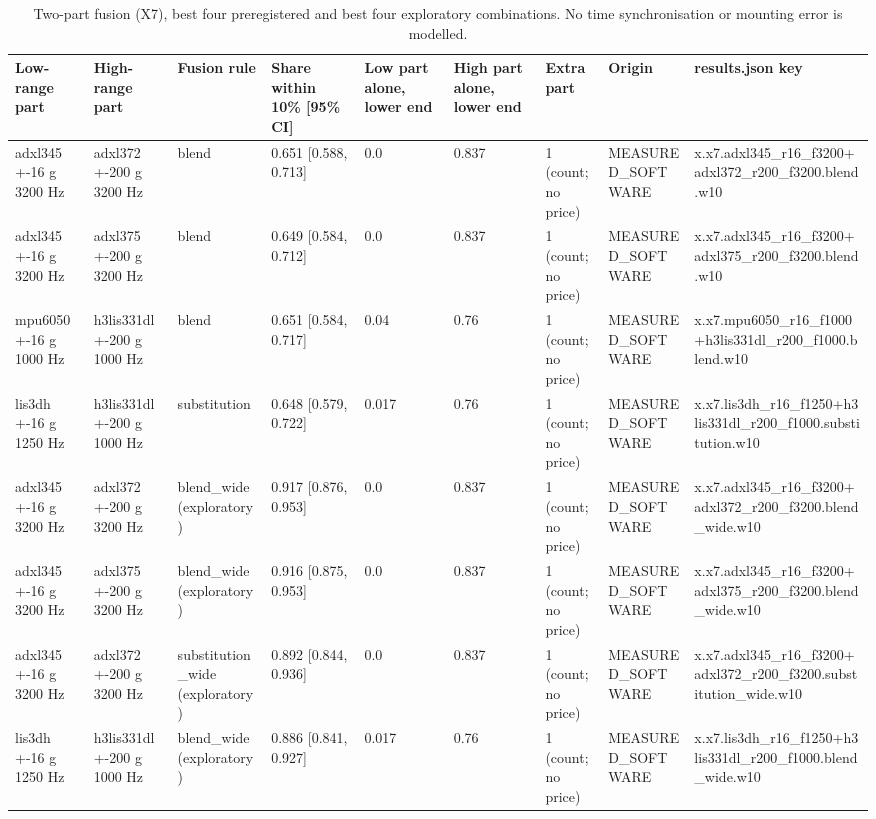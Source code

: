 \begin{table}[t]
\centering
\small
\caption{Two-part fusion (X7), best four preregistered and best four exploratory combinations. No time synchronisation or mounting error is modelled.}
\label{tab:jp_tab_x7}
\begin{tabular}{lllllllll}
\toprule
Low-range part & High-range part & Fusion rule & Share within 10\% [95\% CI] & Low part alone, lower end & High part alone, lower end & Extra part & Origin & results.json key \\
\midrule
adxl345 +-16 g 3200 Hz & adxl372 +-200 g 3200 Hz & blend & 0.651 [0.588, 0.713] & 0.0 & 0.837 & 1 (count; no price) & MEASURED\_SOFTWARE & x.x7.adxl345\_r16\_f3200+adxl372\_r200\_f3200.blend.w10 \\
adxl345 +-16 g 3200 Hz & adxl375 +-200 g 3200 Hz & blend & 0.649 [0.584, 0.712] & 0.0 & 0.837 & 1 (count; no price) & MEASURED\_SOFTWARE & x.x7.adxl345\_r16\_f3200+adxl375\_r200\_f3200.blend.w10 \\
mpu6050 +-16 g 1000 Hz & h3lis331dl +-200 g 1000 Hz & blend & 0.651 [0.584, 0.717] & 0.04 & 0.76 & 1 (count; no price) & MEASURED\_SOFTWARE & x.x7.mpu6050\_r16\_f1000+h3lis331dl\_r200\_f1000.blend.w10 \\
lis3dh +-16 g 1250 Hz & h3lis331dl +-200 g 1000 Hz & substitution & 0.648 [0.579, 0.722] & 0.017 & 0.76 & 1 (count; no price) & MEASURED\_SOFTWARE & x.x7.lis3dh\_r16\_f1250+h3lis331dl\_r200\_f1000.substitution.w10 \\
adxl345 +-16 g 3200 Hz & adxl372 +-200 g 3200 Hz & blend\_wide (exploratory) & 0.917 [0.876, 0.953] & 0.0 & 0.837 & 1 (count; no price) & MEASURED\_SOFTWARE & x.x7.adxl345\_r16\_f3200+adxl372\_r200\_f3200.blend\_wide.w10 \\
adxl345 +-16 g 3200 Hz & adxl375 +-200 g 3200 Hz & blend\_wide (exploratory) & 0.916 [0.875, 0.953] & 0.0 & 0.837 & 1 (count; no price) & MEASURED\_SOFTWARE & x.x7.adxl345\_r16\_f3200+adxl375\_r200\_f3200.blend\_wide.w10 \\
adxl345 +-16 g 3200 Hz & adxl372 +-200 g 3200 Hz & substitution\_wide (exploratory) & 0.892 [0.844, 0.936] & 0.0 & 0.837 & 1 (count; no price) & MEASURED\_SOFTWARE & x.x7.adxl345\_r16\_f3200+adxl372\_r200\_f3200.substitution\_wide.w10 \\
lis3dh +-16 g 1250 Hz & h3lis331dl +-200 g 1000 Hz & blend\_wide (exploratory) & 0.886 [0.841, 0.927] & 0.017 & 0.76 & 1 (count; no price) & MEASURED\_SOFTWARE & x.x7.lis3dh\_r16\_f1250+h3lis331dl\_r200\_f1000.blend\_wide.w10 \\
\bottomrule
\end{tabular}
\end{table}
